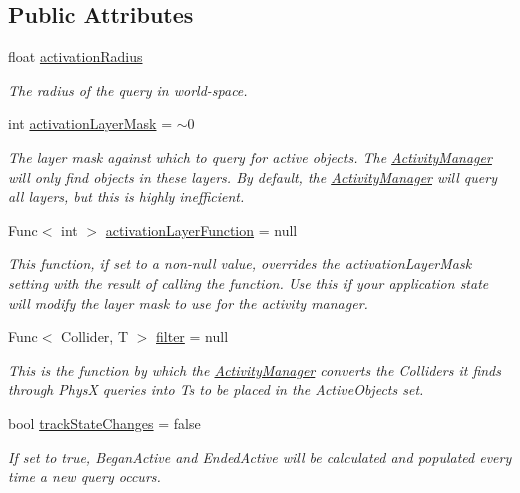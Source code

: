 \subsection*{Public Attributes}
\begin{DoxyCompactItemize}
\item 
float \mbox{\hyperlink{class_leap_1_1_unity_1_1_interaction_1_1_activity_manager_ae47334dd4fde13e8908798fe74cb4e52}{activation\+Radius}}
\begin{DoxyCompactList}\small\item\em The radius of the query in world-\/space. \end{DoxyCompactList}\item 
int \mbox{\hyperlink{class_leap_1_1_unity_1_1_interaction_1_1_activity_manager_a9309b4766f479c3fa53aedae93ccb060}{activation\+Layer\+Mask}} = $\sim$0
\begin{DoxyCompactList}\small\item\em The layer mask against which to query for active objects. The \mbox{\hyperlink{class_leap_1_1_unity_1_1_interaction_1_1_activity_manager}{Activity\+Manager}} will only find objects in these layers. By default, the \mbox{\hyperlink{class_leap_1_1_unity_1_1_interaction_1_1_activity_manager}{Activity\+Manager}} will query all layers, but this is highly inefficient. \end{DoxyCompactList}\item 
Func$<$ int $>$ \mbox{\hyperlink{class_leap_1_1_unity_1_1_interaction_1_1_activity_manager_a37e3a110090bac9e2498bb3f978c823f}{activation\+Layer\+Function}} = null
\begin{DoxyCompactList}\small\item\em This function, if set to a non-\/null value, overrides the activation\+Layer\+Mask setting with the result of calling the function. Use this if your application state will modify the layer mask to use for the activity manager. \end{DoxyCompactList}\item 
Func$<$ Collider, T $>$ \mbox{\hyperlink{class_leap_1_1_unity_1_1_interaction_1_1_activity_manager_ac8bb61c2fa074a351cfc4e7a44a0656b}{filter}} = null
\begin{DoxyCompactList}\small\item\em This is the function by which the \mbox{\hyperlink{class_leap_1_1_unity_1_1_interaction_1_1_activity_manager}{Activity\+Manager}} converts the Colliders it finds through PhysX queries into Ts to be placed in the Active\+Objects set. \end{DoxyCompactList}\item 
bool \mbox{\hyperlink{class_leap_1_1_unity_1_1_interaction_1_1_activity_manager_a0b0c3f27c558d986f943f9f3c1e914d3}{track\+State\+Changes}} = false
\begin{DoxyCompactList}\small\item\em If set to true, Began\+Active and Ended\+Active will be calculated and populated every time a new query occurs. \end{DoxyCompactList}\end{DoxyCompactItemize}
